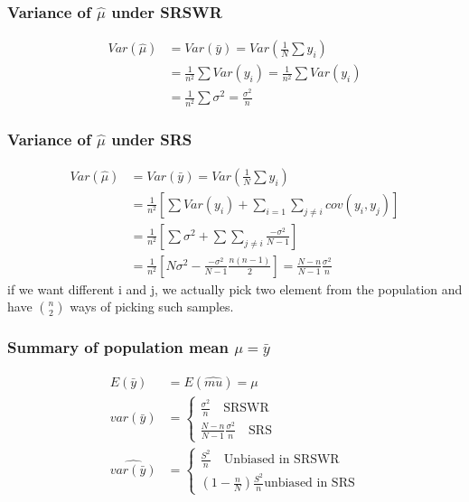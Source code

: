 \documentclass{article}
\theoremstyle{definition}
\theoremstyle{thrm}
\theoremstyle{lma}
\theoremstyle{ppst}
\theoremstyle{crlr}
\begin{document}
\subsubsection{Variance of $\hat{\mu}$ under SRSWR}
\begin{align*}
	Var(\hat{\mu})&=Var(\bar{y}) = Var(\frac{1}{N}\sum y_i)\\
	 &= \frac{1}{n^2}\sum Var(y_i) = \frac{1}{n^2}\sum Var(y_i)\\
	 &= \frac{1}{n^2}\sum \sigma^2 = \frac{\sigma^2}{n}
\end{align*}

\subsubsection{Variance of $\hat{\mu}$ under SRS}
\begin{align*}
	Var(\hat{\mu})&=Var(\bar{y}) = Var(\frac{1}{N}\sum y_i)\\
	 &= \frac{1}{n^2}[\sum Var(y_i)+\sum_{i=1}\sum_{j\neq i}cov(y_i,y_j)]\\
	 &= \frac{1}{n^2} [\sum \sigma^2 + \sum \sum_{j\neq i} \frac{-\sigma^2}{N-1}]\\
	 &=\frac{1}{n^2}[N\sigma^2-\frac{-\sigma^2}{N-1}\frac{n(n-1)}{2}] = \frac{N-n}{N-1}\frac{\sigma^2}{n}
\end{align*}
if we want different i and j, we actually pick two element from the population and have $n\choose 2$ ways of picking such samples.
\subsubsection{Summary of population mean $\mu = \bar{y}$}
\begin{align*}
	E(\bar{y}) &= E(\hat{mu}) = \mu\\
	var(\bar{y}) &= \begin{cases}
		\frac{\sigma^2}{n}\quad \text{SRSWR}\\
		\frac{N-n}{N-1}\frac{\sigma^2}{n} \quad \text{SRS}
	\end{cases}\\
	\widehat{var(\bar{y})} &= \begin{cases}
		\frac{S^2}{n} \quad \text{Unbiased in SRSWR}\\
		(1-\frac{n}{N})\frac{S^2}{n} \text{unbiased in SRS}
	\end{cases}
\end{align*}
\end{document}
